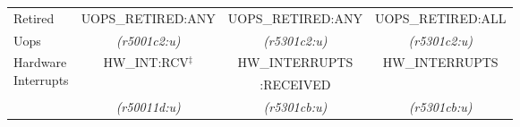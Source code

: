 \begin{tabular}{|l||c|c|c|}
\hline
Retired               &  
UOPS\_RETIRED:ANY     & %
UOPS\_RETIRED:ANY     & %
UOPS\_RETIRED:ALL     \\ %


Uops                  &
{\em (r5001c2:u)}     & %
{\em (r5301c2:u)}     & %
{\em (r5301c2:u)}     \\ %


\hline
\multirow{3}{*}{\parbox{0.5in}{Hardware\\
Interrupts}}				&
\multirow{2}{*}{HW\_INT:RCV$^{\ddagger}$} & %
HW\_INTERRUPTS				& %
\multirow{2}{*}{HW\_INTERRUPTS}          \\ %

			&
			& %
:RECEIVED		& %
			\\ %

			&
{\em (r50011d:u)}     & %
{\em (r5301cb:u)}     & %
{\em (r5301cb:u)}     \\ %


\hline

\end{tabular}
